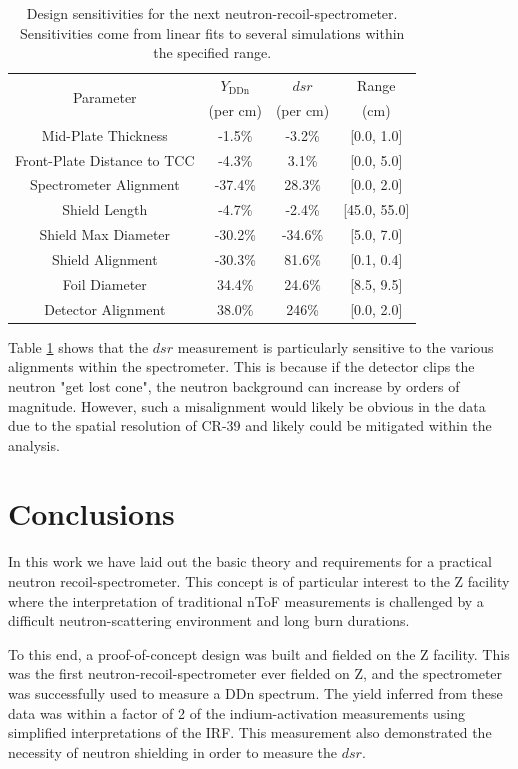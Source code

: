 \begin{table}[!h]
	\caption{ Design sensitivities for the next neutron-recoil-spectrometer. Sensitivities come from linear fits to several simulations within the specified range.  }
	\label{tab_designSensitivities}
	\renewcommand{\arraystretch}{1.2} 
	\centering
	\begin{tabular}{  c | c | c | c }
		\multirow{2}{*}{Parameter} & $Y_{\mathrm{DDn}}$ & $dsr$ & Range \\
		&(per cm)&(per cm)&(cm)\\\hline
		Mid-Plate Thickness & -1.5\%  & -3.2\% & [0.0, 1.0]\\
		Front-Plate Distance to TCC & -4.3\%  & 3.1\% &[0.0, 5.0] \\
		Spectrometer Alignment & -37.4\%  & 28.3\% & [0.0, 2.0]  \\
		Shield Length & -4.7\%  & -2.4\% & [45.0, 55.0] \\
		Shield Max Diameter & -30.2\%  & -34.6\% & [5.0, 7.0] \\
		Shield Alignment & -30.3\% & 81.6\% & [0.1, 0.4] \\
		Foil Diameter & 34.4\%  & 24.6\% & [8.5, 9.5] \\
		Detector Alignment & 38.0\%  & 246\% & [0.0, 2.0]\\
	\end{tabular}		
\end{table}

Table \ref{tab_designSensitivities} shows that the $dsr$ measurement is particularly sensitive to the various alignments within the spectrometer. This is because if the detector clips the neutron "get lost cone", the neutron background can increase by orders of magnitude. However, such a misalignment would likely be obvious in the data due to the spatial resolution of CR-39 and likely could be mitigated within the analysis. 

\section{Conclusions}

In this work we have laid out the basic theory and requirements for a practical neutron recoil-spectrometer. This concept is of particular interest to the Z facility where the interpretation of traditional nToF measurements is challenged by a difficult neutron-scattering environment and long burn durations. 

To this end, a proof-of-concept design was built and fielded on the Z facility. This was the first neutron-recoil-spectrometer ever fielded on Z, and the spectrometer was successfully used to measure a DDn spectrum. The yield inferred from these data was within a factor of 2 of the indium-activation measurements using simplified interpretations of the IRF. This measurement also demonstrated the necessity of neutron shielding in order to measure the $dsr$. 

